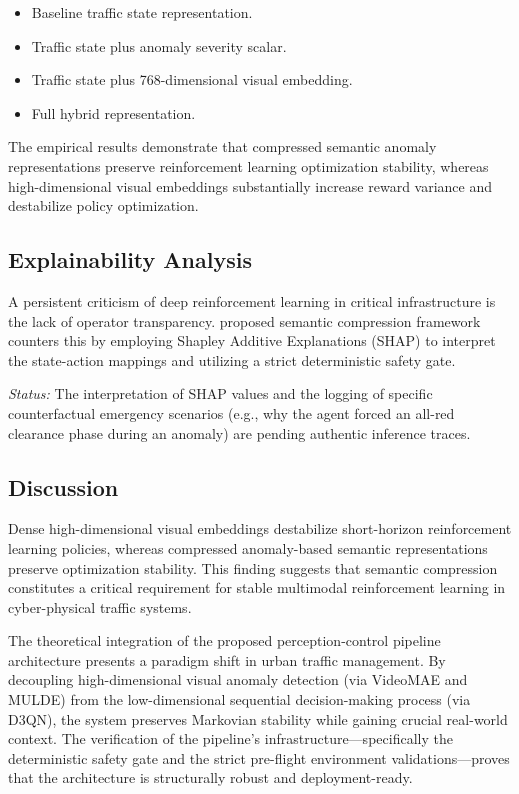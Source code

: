 \documentclass[conference]{IEEEtran}
\begin{document}
\begin{itemize}
\item Baseline traffic state representation.
\item Traffic state plus anomaly severity scalar.
\item Traffic state plus 768-dimensional visual embedding.
\item Full hybrid representation.
\end{itemize}

The empirical results demonstrate that compressed semantic anomaly representations preserve reinforcement learning optimization stability, whereas high-dimensional visual embeddings substantially increase reward variance and destabilize policy optimization.

\subsection{Explainability Analysis}
\label{subsec:explainability}

A persistent criticism of deep reinforcement learning in critical infrastructure is the lack of operator transparency. proposed semantic compression framework counters this by employing Shapley Additive Explanations (SHAP) to interpret the state-action mappings and utilizing a strict deterministic safety gate.

\textit{Status:} The interpretation of SHAP values and the logging of specific counterfactual emergency scenarios (e.g., why the agent forced an all-red clearance phase during an anomaly) are pending authentic inference traces.

\subsection{Discussion}

Dense high-dimensional visual embeddings destabilize short-horizon reinforcement learning policies, whereas compressed anomaly-based semantic representations preserve optimization stability. This finding suggests that semantic compression constitutes a critical requirement for stable multimodal reinforcement learning in cyber-physical traffic systems.

\label{subsec:discussion}

The theoretical integration of the proposed perception-control pipeline architecture presents a paradigm shift in urban traffic management. By decoupling high-dimensional visual anomaly detection (via VideoMAE and MULDE) from the low-dimensional sequential decision-making process (via D3QN), the system preserves Markovian stability while gaining crucial real-world context. The verification of the pipeline's infrastructure—specifically the deterministic safety gate and the strict pre-flight environment validations—proves that the architecture is structurally robust and deployment-ready.
\end{document}
